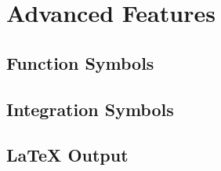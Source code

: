 
\chapter{Advanced Features}

\section{Function Symbols}

\section{Integration Symbols}

\section{\LaTeX{} Output}


